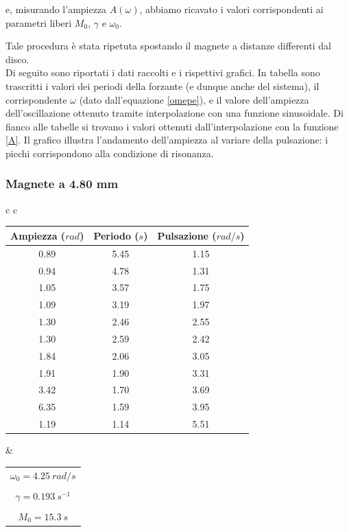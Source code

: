e, misurando l'ampiezza $A(\omega)$, abbiamo ricavato i valori corrispondenti ai parametri liberi $M_0$, $\gamma$ e $\omega_0$. 

Tale procedura è stata ripetuta spostando il magnete a distanze differenti dal disco.
\\
Di seguito sono riportati i dati raccolti e i rispettivi grafici. In tabella sono trascritti i valori dei periodi della forzante (e dunque anche del sistema), il corrispondente $\omega$ (dato dall'equazione \ref{omepe}), e il valore dell'ampiezza dell'oscillazione ottenuto tramite interpolazione con una funzione sinusoidale. Di fianco alle tabelle si trovano i valori ottenuti dall'interpolazione con la funzione \ref{A}. Il grafico illustra l'andamento dell'ampiezza al variare della pulsazione: i picchi corrispondono alla condizione di risonanza.

\subsubsection{Magnete a 4.80 mm}

\begin{center}

\begin{tabular}{c c}

\begin{tabular}{c | c | c}
\textbf{Ampiezza ($rad$)} & \textbf{Periodo ($s$)} & \textbf{Pulsazione ($rad/s$)}\\
\midrule
0.89 & 5.45 & 1.15\\
0.94 & 4.78 & 1.31\\
1.05 & 3.57 & 1.75\\
1.09 & 3.19 & 1.97\\
1.30 & 2.46 & 2.55\\
1.30 & 2.59 & 2.42\\
1.84 & 2.06 & 3.05\\
1.91 & 1.90 & 3.31\\
3.42 & 1.70 & 3.69\\
6.35 & 1.59 & 3.95\\
1.19 & 1.14 & 5.51\\
\end{tabular}

& \hspace{1cm} 

\begin{tabular}{c}
$ \omega_0 = 4.25\ rad/s $\\
\\
$ \gamma = 0.193\ s^{-1}$\\
\\
$ M_0 = 15.3\ s$\\
\end{tabular} 

\end{tabular}

\end{center}
 

